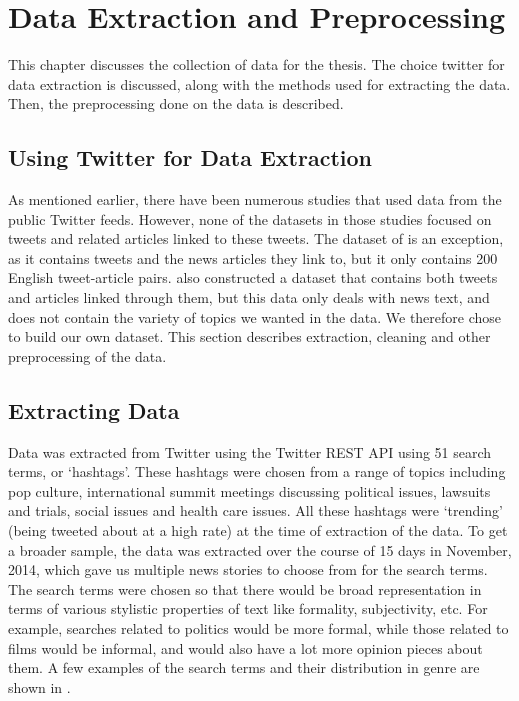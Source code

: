 \chapter{Data Extraction and Preprocessing}
\label{chap:data}

This chapter discusses the collection of data for the thesis. The choice twitter for data extraction is discussed, along with the methods used for extracting the data. Then, the preprocessing done on the data is described. 


\section{Using Twitter for Data Extraction}

As mentioned earlier, there have been numerous studies that used data from the public Twitter feeds. However, none of the datasets in those studies focused on tweets and related articles linked to these tweets. The dataset of \cite{lloret2013towards} is an exception, as it contains tweets and the news articles they link to, but it only contains 200 English tweet-article pairs. \cite{wei2014utilizing} also constructed a dataset that contains both tweets and articles linked through them, but this data only deals with news text, and does not contain the variety of topics we wanted in the data. We therefore chose to build our own dataset. This section describes extraction, cleaning and other preprocessing of the data.

\section{Extracting Data}

Data was extracted from Twitter using the Twitter REST API using 51 search terms, or ‘hashtags’. These hashtags were chosen from a range of topics including pop culture,  international summit meetings discussing political issues, lawsuits and trials, social issues and health care issues. All these hashtags were ‘trending’ (being tweeted about at a high rate) at the time of extraction of the data. To get a broader sample, the data was extracted over the course of 15 days in November, 2014, which gave us multiple news stories to choose from for the search terms. The search terms were chosen so that there would be broad representation in terms of various stylistic properties of text like formality, subjectivity, etc. For example, searches related to politics would be more formal, while those related to films would be informal, and would also have a lot more opinion pieces about them. A few examples of the search terms and their distribution in genre are shown in .

